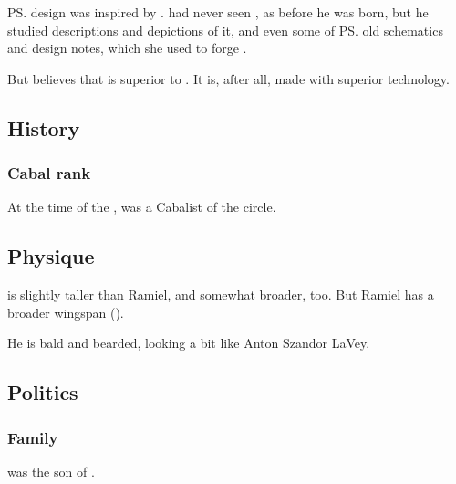\ps{\Scaleron} design was inspired by . 
\Dasteron{} had never seen \Ascaril, as  before he was born, but he studied descriptions and depictions of it, and even some of \ps{} old schematics and design notes, which she used to forge \Ascaril. 

But \Dasteron{} believes that \Scaleron{} is superior to \Ascaril. 
It is, after all, made with superior technology. 









\subsection{History}





\subsubsection{Cabal rank}
At the time of the \thirdbanewar, \Dasteron was a Cabalist of the \dasteroncircle circle. 









\subsection{Physique}
\Dasteron{} is slightly taller than Ramiel, and somewhat broader, too. 
But Ramiel has a broader wingspan (). 

He is bald and bearded, looking a bit like Anton Szandor LaVey. 









\subsection{Politics}





\subsubsection{Family}
\Dasteron{} was the son of . 

